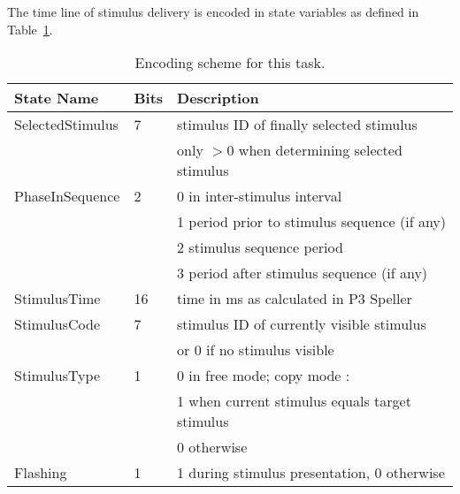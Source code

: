 \documentclass[letterpaper,oneside,12pt]{article}
\begin{document}
The time line of stimulus delivery is encoded in state variables as defined in
Table~\ref{tab:states}.
\begin{table}
\begin{center}
\begin{tabular}[ht]{|l|l|l|}
\hline
\bf{State Name}& \bf{Bits}            & \bf{Description} \\
\hline
\hline
 SelectedStimulus & 7 & stimulus ID of finally selected stimulus \\
                  &   & only $>$0 when determining selected stimulus\\
\hline
 PhaseInSequence  & 2 & 0 in inter-stimulus interval\\
                  &   & 1 period prior to stimulus sequence (if any)\\
                  &   & 2 stimulus sequence period\\
                  &   & 3 period after stimulus sequence (if any)\\
\hline
 StimulusTime     & 16& time in ms as calculated in P3 Speller\\
\hline
 StimulusCode     & 7 & stimulus ID of currently visible stimulus\\
                  &   & or 0 if no stimulus visible\\
\hline
 StimulusType     & 1 & 0 in free mode; copy mode :\\
                  &   & 1 when current stimulus equals target stimulus\\
                  &   & 0 otherwise\\
\hline
 Flashing         & 1 & 1 during stimulus presentation, 0 otherwise\\
\hline
\end{tabular}
\caption{Encoding scheme for this task.}
\label{tab:states}
\end{center}
\end{table}

\end{document}
